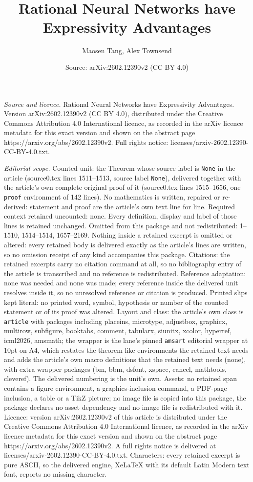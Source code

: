 \documentclass[10pt,a4paper]{amsart}
\title[Rational Neural Networks have Expressivity Advantages]{Rational Neural Networks have Expressivity Advantages}
\author{Maosen Tang, Alex Townsend}
\date{Source: arXiv:2602.12390v2 (CC BY 4.0)}
\begin{document}
\maketitle

\noindent\emph{Source and licence.} Rational Neural Networks have Expressivity Advantages. Version arXiv:2602.12390v2 (CC BY 4.0), distributed under the Creative Commons Attribution 4.0 International licence, as recorded in the arXiv licence metadata for this exact version and shown on the abstract page https://arxiv.org/abs/2602.12390v2. Full rights notice: licenses/arxiv-2602.12390-CC-BY-4.0.txt.\par\smallskip

\noindent\textit{Editorial scope.} Counted unit: the Theorem whose source label is \texttt{None} in the article (source0.tex lines 1511--1513, source label \texttt{None}), delivered together with the article's own complete original proof of it (source0.tex lines 1515--1656, one \texttt{proof} environment of 142 lines). No mathematics is written, repaired or re-derived: statement and proof are the article's own text line for line. Required context retained uncounted: none. Every definition, display and label of those lines is retained unchanged. Omitted from this package and not redistributed: 1--1510, 1514--1514, 1657--2169. Nothing inside a retained excerpt is omitted or altered: every retained body is delivered exactly as the article's lines are written, so no omission receipt of any kind accompanies this package. Citations: the retained excerpts carry no citation command at all, so no bibliography entry of the article is transcribed and no reference is redistributed. Reference adaptation: none was needed and none was made; every reference inside the delivered unit resolves inside it, so no unresolved reference or citation is produced. Printed slips kept literal: no printed word, symbol, hypothesis or number of the counted statement or of its proof was altered. Layout and class: the article's own class is \texttt{article} with packages including placeins, microtype, adjustbox, graphicx, multirow, subfigure, booktabs, comment, tabularx, siunitx, xcolor, hyperref, icml2026, amsmath; the wrapper is the lane's pinned \texttt{amsart} editorial wrapper at 10pt on A4, which restates the theorem-like environments the retained text needs and adds the article's own macro definitions that the retained text needs (none), with extra wrapper packages (bm, bbm, dsfont, xspace, cancel, mathtools, cleveref). The delivered numbering is the unit's own. Assets: no retained span contains a figure environment, a graphics-inclusion command, a PDF-page inclusion, a table or a TikZ picture; no image file is copied into this package, the package declares no asset dependency and no image file is redistributed with it. Licence: version arXiv:2602.12390v2 of this article is distributed under the Creative Commons Attribution 4.0 International licence, as recorded in the arXiv licence metadata for this exact version and shown on the abstract page https://arxiv.org/abs/2602.12390v2. A full rights notice is delivered at licenses/arxiv-2602.12390-CC-BY-4.0.txt. Characters: every retained excerpt is pure ASCII, so the delivered engine, XeLaTeX with its default Latin Modern text font, reports no missing character.
\end{document}
